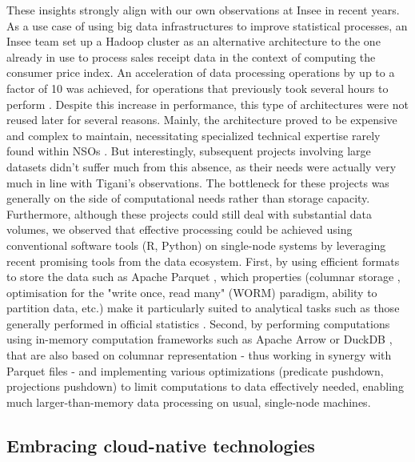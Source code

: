 These insights strongly align with our own observations at Insee in recent years. As a use case of using big data infrastructures to improve statistical processes, an Insee team set up a Hadoop cluster as an alternative architecture to the one already in use to process sales receipt data in the context of computing the consumer price index. An acceleration of data processing operations by up to a factor of 10 was achieved, for operations that previously took several hours to perform \cite{leclair2019utiliser}. Despite this increase in performance, this type of architectures were not reused later for several reasons. Mainly, the architecture proved to be expensive and complex to maintain, necessitating specialized technical expertise rarely found within NSOs \cite{vale2015international}. But interestingly, subsequent projects involving large datasets didn't suffer much from this absence, as their needs were actually very much in line with Tigani's observations. The bottleneck for these projects was generally on the side of computational needs rather than storage capacity. Furthermore, although these projects could still deal with substantial data volumes, we observed that effective processing could be achieved using conventional software tools (R, Python) on single-node systems by leveraging recent promising tools from the data ecosystem. First, by using efficient formats to store the data such as Apache Parquet \cite{parquet2013}, which properties (columnar storage \cite{abadi2013design}, optimisation for the "write once, read many" (WORM) paradigm, ability to partition data, etc.) make it particularly suited to analytical tasks such as those generally performed in official statistics \cite{abdelaziz2023optimizing}. Second, by performing computations using in-memory computation frameworks such as Apache Arrow \cite{arrow2016} or DuckDB \cite{raasveldt2019duckdb}, that are also based on columnar representation - thus working in synergy with Parquet files - and implementing various optimizations (predicate pushdown, projections pushdown) to limit computations to data effectively needed, enabling much larger-than-memory data processing on usual, single-node machines.


\subsection{Embracing cloud-native technologies}

